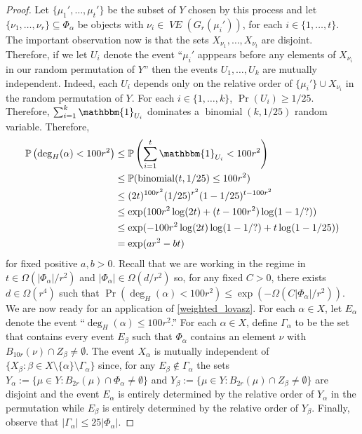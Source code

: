 \documentclass{patmorin}
\DeclareMathOperator{\binomial}{binomial}
\DeclareMathOperator{\VE}{\mathit{VE}}
\begin{document}
\begin{proof}
  Let $\{\mu_1',\ldots,\mu_t'\}$ be the subset of $Y$ chosen by this process and let $\{\nu_1,\ldots,\nu_r\}\subseteq\Phi_\alpha$ be objects with $\nu_i\in\VE(G_r(\mu_i'))$, for each $i\in\{1,\ldots,t\}$.  The important observation now is that the sets $X_{\nu_1},\ldots,X_{\nu_t}$ are disjoint.  Therefore, if we let $U_i$ denote the event ``$\mu_i'$ apppears before any elements of $X_{\nu_i}$ in our random permutation of $Y$'' then the events $U_1,\ldots,U_k$ are mutually independent.  Indeed, each $U_i$ depends only on the relative order of $\{\mu_i'\}\cup X_{\nu_i}$ in the random permutation of $Y$.  For each $i\in\{1,\ldots,k\}$, $\Pr(U_i)\ge 1/25$.  Therefore, $\sum_{i=1}^k \mathbbm{1}_{U_i}$ dominates a $\binomial(k,1/25)$ random variable.  Therefore,
  \begin{align*}
    \Pr\left(\deg_H(\alpha)< 100r^2\right)
    & \le \Pr\left(\sum_{i=1}^t \mathbbm{1}_{U_i} < 100r^2\right) \\
    & \le \Pr(\binomial(t,1/25)\le 100r^2) \\
    & \le (2t)^{100r^2}(1/25)^{r^2}(1-1/25)^{t-100r^2} \\
    & \le \exp(100r^2\log(2t)+(t-100r^2)\log(1-1/?)) \\
    & \le \exp(-100r^2\log(2t)\log(1-1/?) + t\log(1-1/25)) \\
    & = \exp(ar^2 - bt)
  \end{align*}
  for fixed positive $a,b>0$.  Recall that we are working in the regime in  $t\in\Omega(|\Phi_\alpha|/r^2)$ and $|\Phi_\alpha|\in\Omega(d/r^2)$ so, for any fixed $C>0$, there exists $d\in\Omega(r^4)$ such that 
  $\Pr(\deg_H(\alpha)< 100r^2)\le \exp(-\Omega(C|\Phi_\alpha|/r^2))$.
  We are now ready for an application of \cref{weighted_lovasz}.  For each $\alpha\in X$, let $E_\alpha$ denote the event ``$\deg_H(\alpha)\le 100r^2$.''  For each $\alpha\in X$, define $\Gamma_\alpha$ to be the set that contains every event $E_\beta$ such that $\Phi_\alpha$ contains an element $\nu$ with $B_{10r}(\nu)\cap Z_\beta\neq\emptyset$.  The event $X_\alpha$ is mutually independent of $\{X_\beta:\beta\in X\setminus\{\alpha\}\setminus\Gamma_\alpha\}$ since, for any $E_\beta\not\in \Gamma_\alpha$ the sets $Y_\alpha:=\{\mu\in Y:B_{2r}(\mu)\cap \Phi_\alpha\neq\emptyset\}$ and $Y_\beta:=\{\mu\in Y:B_{2r}(\mu)\cap Z_\beta\neq\emptyset\}$ are disjoint and the event $E_\alpha$ is entirely determined by the relative order of $Y_\alpha$ in the permutation while $E_\beta$ is entirely determined by the relative order of $Y_\beta$.   Finally, observe that $|\Gamma_\alpha|\le 25|\Phi_\alpha|$.


\end{proof}
\end{document}

